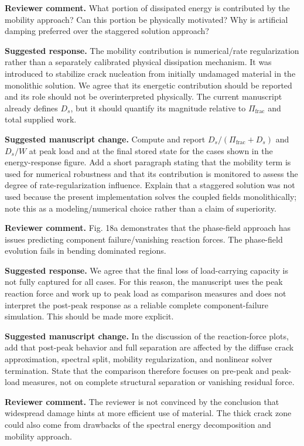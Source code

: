 \documentclass[11pt,a4paper]{article}
\newcommand{\comment}[1]{\par\noindent\textbf{Reviewer comment.} #1\par}
\newcommand{\response}[1]{\par\noindent\textbf{Suggested response.} #1\par}
\newcommand{\change}[1]{\par\noindent\textbf{Suggested manuscript change.} #1\par}
\begin{document}
\comment{What portion of dissipated energy is contributed by the mobility
approach? Can this portion be physically motivated? Why is artificial damping
preferred over the staggered solution approach?}

\response{The mobility contribution is numerical/rate regularization rather
than a separately calibrated physical dissipation mechanism. It was introduced
to stabilize crack nucleation from initially undamaged material in the
monolithic solution. We agree that its energetic contribution should be reported
and its role should not be overinterpreted physically. The current manuscript
already defines \(D_s\), but it should quantify its magnitude relative to
\(\Pi_{\mathrm{frac}}\) and total supplied work.}

\change{Compute and report
\(D_s/(\Pi_{\mathrm{frac}}+D_s)\) and \(D_s/W\) at peak load and at the final
stored state for the cases shown in the energy-response figure. Add a short
paragraph stating that the mobility term is used for numerical robustness and
that its contribution is monitored to assess the degree of rate-regularization
influence. Explain that a staggered solution was not used because the present
implementation solves the coupled fields monolithically; note this as a
modeling/numerical choice rather than a claim of superiority.}

\comment{Fig. 18a demonstrates that the phase-field approach has issues
predicting component failure/vanishing reaction forces. The phase-field
evolution fails in bending dominated regions.}

\response{We agree that the final loss of load-carrying capacity is not fully
captured for all cases. For this reason, the manuscript uses the peak reaction
force and work up to peak load as comparison measures and does not interpret
the post-peak response as a reliable complete component-failure simulation.
This should be made more explicit.}

\change{In the discussion of the reaction-force plots, add that post-peak
behavior and full separation are affected by the diffuse crack approximation,
spectral split, mobility regularization, and nonlinear solver termination.
State that the comparison therefore focuses on pre-peak and peak-load measures,
not on complete structural separation or vanishing residual force.}

\comment{The reviewer is not convinced by the conclusion that widespread
damage hints at more efficient use of material. The thick crack zone could also
come from drawbacks of the spectral energy decomposition and mobility approach.}
\end{document}
